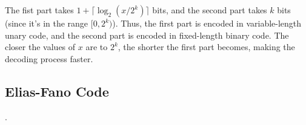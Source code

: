 \noindent The fist part takes $1 + \lceil\log_2(x/2^k)\rceil$ bits, and the second part takes $k$ bits (since it's in the range $[0,2^k)$). Thus, the first part is encoded in variable-length unary code, and the second part is encoded in fixed-length binary code. The closer the values of $x$ are to $2^k$, the shorter the first part becomes, making the decoding process faster.




\subsection{Elias-Fano Code}

.

